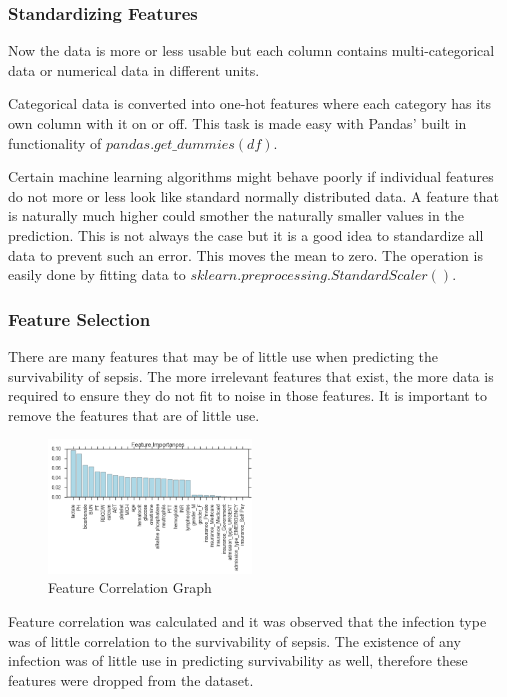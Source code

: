 \documentclass[11pt]{article}
\begin{document}
		\subsubsection{Standardizing Features}
		Now the data is more or less usable but each column contains multi-categorical data or numerical data in different units.
		
		Categorical data is converted into one-hot features where each category has its own column with it on or off. This task is made easy with Pandas' built in functionality of \(pandas.get\_dummies(df)\).
		
		Certain machine learning algorithms might behave poorly if individual features do not more or less look like standard normally distributed data. A feature that is naturally much higher could smother the naturally smaller values in the prediction. This is not always the case but it is a good idea to standardize all data to prevent such an error. This moves the mean to zero. The operation is easily done by fitting data to \(sklearn.preprocessing.StandardScaler()\).
		
		\subsubsection{Feature Selection}
		There are many features that may be of little use when predicting the survivability of sepsis. The more irrelevant features that exist, the more data is required to ensure they do not fit to noise in those features. It is important to remove the features that are of little use. 
		
		\begin{figure}
			\begin{center}
				\includegraphics[width=0.48\textwidth]{feature_correlation_2.png}
			\end{center}
			\caption{Feature Correlation Graph}
		\end{figure}
		
		Feature correlation was calculated and it was observed that the infection type was of little correlation to the survivability of sepsis. The existence of any infection was of little use in predicting survivability as well, therefore these features were dropped from the dataset.
		
\end{document}
